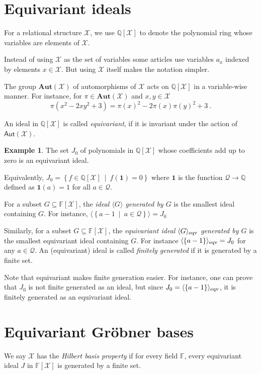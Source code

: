 \documentclass[12pt,a4paper,article]{memoir}
\newcommand{\struct}{\mathcal{X}}
\newcommand{\dloQ}{\mathcal{Q}}
\newcommand{\Q}{\mathbb{Q}}
\newcommand{\F}{\mathbb{F}}
\newcommand{\aut}[1]{\mathsf{Aut}\left(#1\right)}
\newcommand{\poly}[2]{#1[#2]}
\newcommand{\setof}[2]{\left\{#1\ \mid\ #2 \right\}}
\newcommand{\idGen}[1]{\langle#1\rangle}
\newcommand{\eqIdGen}[1]{\langle#1\rangle_{\textnormal{eqv}}}
\newcommand{\emphdef}[1]{\emph{\textcolor{BrickRed}{#1}}}
\theoremstyle{definition}
\newtheorem{example}[theorem]{Example}
\begin{document}
\section{Equivariant ideals}
%
For a relational structure $\struct$,
we use $\mathbb{Q}[\struct]$ to denote the polynomial ring whose variables are elements of $\struct$.

Instead of using $\struct$ as the set of variables some articles use variables $a_{x}$ indexed by elements $x\in\struct$.
But using $\struct$ itself makes the notation simpler.

The group $\mathbf{Aut}(\struct)$ of automorphisms of $\struct$ acts on $\mathbb{Q}[\struct]$ in a variable-wise manner.
For instance, for $\pi\in\mathbf{Aut}(\struct)$ and $x,y\in\struct$
$$\pi(x^2 - 2xy^2 + 3) =
\pi(x)^2 - 2\pi(x)\pi(y)^2 + 3\ .$$

An ideal in $\poly{\Q}{\struct}$ is called \emphdef{equivariant},
if it is invariant under the action of $\aut{\struct}$.
%
\begin{example}
The set $J_0$ of polynomials in $\poly{\Q}{\struct}$ whose coefficients add up to zero is an equivariant ideal.

Equivalently, $J_0 = \setof{f\in\poly{\Q}{\struct}}{f(\mathbf{1}) = 0}$ where $\mathbf{1}$ is the function $\dloQ\to\Q$ defined as $\mathbf{1}(a) = 1$ for all $a\in\dloQ$.
\end{example}
%
For a subset $G\subseteq\poly{\F}{\struct}$,
the \emphdef{ideal $\idGen{G}$ generated by $G$} is the smallest ideal containing $G$.
For instance, $\idGen{\setof{a - 1}{a\in\dloQ}} = J_0$

Similarly, for a subset $G\subseteq\poly{\F}{\struct}$,
the \emphdef{equivariant ideal $\eqIdGen{G}$ generated by $G$} is the smallest equivariant ideal containing $G$.
For instance $\eqIdGen{\{a - 1\}} = J_0$ for any $a\in\dloQ$.
%
An (equivariant) ideal is called \emphdef{finitely generated} if it is generated by a finite set.

Note that equivariant makes finite generation easier.
For instance, one can prove that $J_0$ is not finite generated as an ideal,
but since $J_0 = \eqIdGen{\{a - 1\}}$,
it is finitely generated as an equivariant ideal.
%
\section{Equivariant Gröbner bases}
%
We say $\struct$ has the \emphdef{Hilbert basis property} if for every field $\F$, every equivariant ideal $J$ in $\poly{\F}{\struct}$ is generated by a finite set.
\end{document}
